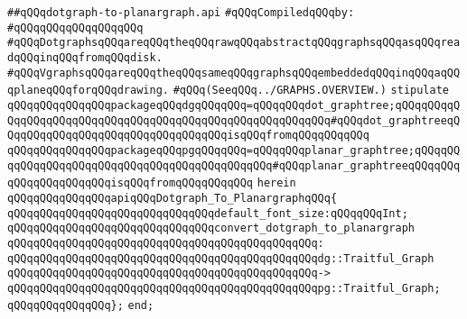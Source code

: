 \label{src/lib/std/dot/dotgraph-to-planargraph.api}
\verb|##qQQqdotgraph-to-planargraph.api|\newline
\newline
\verb|#qQQqCompiledqQQqby:|\newline
\verb|#qQQqqQQqqQQqqQQqqQQq|\newline
\newline
\verb|#qQQqDotgraphsqQQqareqQQqtheqQQqrawqQQqabstractqQQqgraphsqQQqasqQQqreadqQQqinqQQqfromqQQqdisk.|\newline
\verb|#qQQqVgraphsqQQqareqQQqtheqQQqsameqQQqgraphsqQQqembeddedqQQqinqQQqaqQQqplaneqQQqforqQQqdrawing.|\newline
\verb|#qQQq(SeeqQQq../GRAPHS.OVERVIEW.)|\newline
\newline
\verb|stipulate|\newline
\verb|qQQqqQQqqQQqqQQqpackageqQQqdgqQQqqQQq=qQQqqQQqdot_graphtree;qQQqqQQqqQQqqQQqqQQqqQQqqQQqqQQqqQQqqQQqqQQqqQQqqQQqqQQqqQQq#qQQqdot_graphtreeqQQqqQQqqQQqqQQqqQQqqQQqqQQqqQQqqQQqisqQQqfromqQQqqQQqqQQq|\newline
\verb|qQQqqQQqqQQqqQQqpackageqQQqpgqQQqqQQq=qQQqqQQqplanar_graphtree;qQQqqQQqqQQqqQQqqQQqqQQqqQQqqQQqqQQqqQQqqQQqqQQq#qQQqplanar_graphtreeqQQqqQQqqQQqqQQqqQQqqQQqisqQQqfromqQQqqQQqqQQq|\newline
\verb|herein|\newline
\newline
\verb|qQQqqQQqqQQqqQQqapiqQQqDotgraph_To_PlanargraphqQQq{|\newline
\newline
\verb|qQQqqQQqqQQqqQQqqQQqqQQqqQQqqQQqdefault_font_size:qQQqqQQqInt;|\newline
\newline
\verb|qQQqqQQqqQQqqQQqqQQqqQQqqQQqqQQqconvert_dotgraph_to_planargraph|\newline
\verb|qQQqqQQqqQQqqQQqqQQqqQQqqQQqqQQqqQQqqQQqqQQqqQQq:|\newline
\verb|qQQqqQQqqQQqqQQqqQQqqQQqqQQqqQQqqQQqqQQqqQQqqQQqdg::Traitful_Graph|\newline
\verb|qQQqqQQqqQQqqQQqqQQqqQQqqQQqqQQqqQQqqQQqqQQqqQQq->|\newline
\verb|qQQqqQQqqQQqqQQqqQQqqQQqqQQqqQQqqQQqqQQqqQQqqQQqpg::Traitful_Graph;|\newline
\verb|qQQqqQQqqQQqqQQq};|\newline
\newline
\verb|end;|\newline

